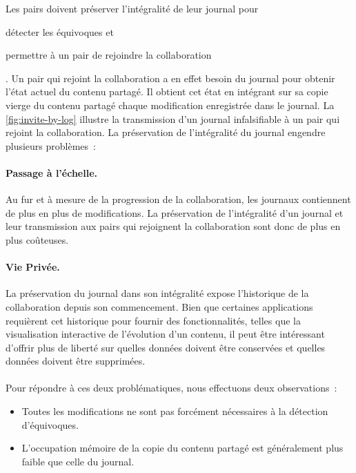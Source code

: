 Les pairs doivent préserver l'intégralité de leur journal pour \begin{inlinelist}
\item détecter les équivoques et
\item permettre à un pair de rejoindre la collaboration
\end{inlinelist}.
Un pair qui rejoint la collaboration a en effet besoin du journal pour obtenir l'état actuel du contenu partagé.
Il obtient cet état en intégrant sur sa copie vierge du contenu partagé chaque modification enregistrée dans le journal.
La \autoref{fig:invite-by-log} illustre la transmission d'un journal infalsifiable à un pair qui rejoint la collaboration.
La préservation de l'intégralité du journal engendre plusieurs problèmes~:

\paragraph{Passage à l'échelle.} Au fur et à mesure de la progression de la collaboration, les journaux contiennent de plus en plus de modifications.
La préservation de l'intégralité d'un journal et leur transmission aux pairs qui rejoignent la collaboration sont donc de plus en plus coûteuses.

\paragraph{Vie Privée.} La préservation du journal dans son intégralité expose l'historique de la collaboration depuis son commencement.
Bien que certaines applications requièrent cet historique pour fournir des fonctionnalités, telles que la visualisation interactive de l'évolution d'un contenu, il peut être intéressant d'offrir plus de liberté sur quelles données doivent être conservées et quelles données doivent être supprimées.

\paragraph{} Pour répondre à ces deux problématiques, nous effectuons deux observations~:
\begin{itemize}
    \item Toutes les modifications ne sont pas forcément nécessaires à la détection d'équivoques.
    \item L'occupation mémoire de la copie du contenu partagé est généralement plus faible que celle du journal.
\end{itemize}


